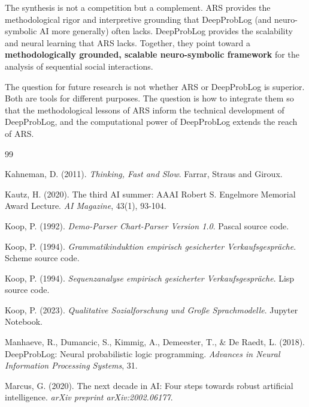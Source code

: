 \documentclass[12pt,a4paper]{article}
\begin{document}
The synthesis is not a competition but a complement. ARS provides the 
methodological rigor and interpretive grounding that DeepProbLog (and 
neuro-symbolic AI more generally) often lacks. DeepProbLog provides the 
scalability and neural learning that ARS lacks. Together, they point toward 
a \textbf{methodologically grounded, scalable neuro-symbolic framework} for 
the analysis of sequential social interactions.

The question for future research is not whether ARS or DeepProbLog is superior. 
Both are tools for different purposes. The question is how to integrate them 
so that the methodological lessons of ARS inform the technical development 
of DeepProbLog, and the computational power of DeepProbLog extends the reach 
of ARS.

\newpage
\begin{thebibliography}{99}

Kahneman, D. (2011). \textit{Thinking, Fast and Slow}. Farrar, Straus and Giroux.

Kautz, H. (2020). The third AI summer: AAAI Robert S. Engelmore Memorial Award 
Lecture. \textit{AI Magazine}, 43(1), 93-104.

Koop, P. (1992). \textit{Demo-Parser Chart-Parser Version 1.0}. Pascal source code.

Koop, P. (1994). \textit{Grammatikinduktion empirisch gesicherter 
Verkaufsgespräche}. Scheme source code.

Koop, P. (1994). \textit{Sequenzanalyse empirisch gesicherter 
Verkaufsgespräche}. Lisp source code.

Koop, P. (2023). \textit{Qualitative Sozialforschung und Große Sprachmodelle}. 
Jupyter Notebook.

Manhaeve, R., Dumancic, S., Kimmig, A., Demeester, T., \& De Raedt, L. (2018). 
DeepProbLog: Neural probabilistic logic programming. \textit{Advances in 
Neural Information Processing Systems}, 31.

Marcus, G. (2020). The next decade in AI: Four steps towards robust artificial 
intelligence. \textit{arXiv preprint arXiv:2002.06177}.

\end{thebibliography}
\end{document}
